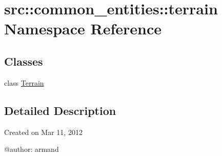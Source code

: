\hypertarget{namespacesrc_1_1common__entities_1_1terrain}{
\section{src::common\_\-entities::terrain Namespace Reference}
\label{namespacesrc_1_1common__entities_1_1terrain}
}
\subsection*{Classes}
\begin{DoxyCompactItemize}
\item 
class \hyperlink{classsrc_1_1common__entities_1_1terrain_1_1Terrain}{Terrain}
\end{DoxyCompactItemize}


\subsection{Detailed Description}
\begin{DoxyVerb}
Created on Mar 11, 2012

@author: armand
\end{DoxyVerb}
 